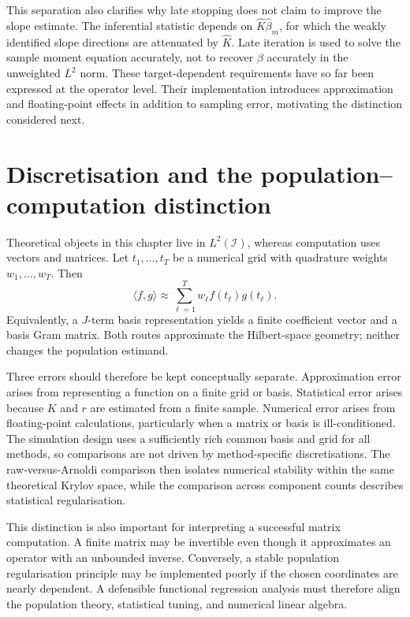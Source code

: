 This separation also clarifies why late stopping does not claim to improve the slope estimate. The inferential statistic depends on $\widehat K\widehat\beta_m$, for which the weakly identified slope directions are attenuated by $\widehat K$. Late iteration is used to solve the sample moment equation accurately, not to recover $\beta$ accurately in the unweighted $L^2$ norm. These target-dependent requirements have so far been expressed at the operator level. Their implementation introduces approximation and floating-point effects in addition to sampling error, motivating the distinction considered next.

\section{Discretisation and the population--computation distinction}
\label{sec:discretisation-distinction}

Theoretical objects in this chapter live in $L^2(\mathcal I)$, whereas computation uses vectors and matrices. Let $t_1,\ldots,t_T$ be a numerical grid with quadrature weights $w_1,\ldots,w_T$. Then
\begin{equation}
    \langle f,g\rangle
    \approx\sum_{\ell=1}^{T}w_\ell f(t_\ell)g(t_\ell).
    \label{eq:quadrature-inner-product}
\end{equation}
Equivalently, a $J$-term basis representation yields a finite coefficient vector and a basis Gram matrix. Both routes approximate the Hilbert-space geometry; neither changes the population estimand.

Three errors should therefore be kept conceptually separate. Approximation error arises from representing a function on a finite grid or basis. Statistical error arises because $K$ and $r$ are estimated from a finite sample. Numerical error arises from floating-point calculations, particularly when a matrix or basis is ill-conditioned. The simulation design uses a sufficiently rich common basis and grid for all methods, so comparisons are not driven by method-specific discretisations. The raw-versus-Arnoldi comparison then isolates numerical stability within the same theoretical Krylov space, while the comparison across component counts describes statistical regularisation.

This distinction is also important for interpreting a successful matrix computation. A finite matrix may be invertible even though it approximates an operator with an unbounded inverse. Conversely, a stable population regularisation principle may be implemented poorly if the chosen coordinates are nearly dependent. A defensible functional regression analysis must therefore align the population theory, statistical tuning, and numerical linear algebra.

